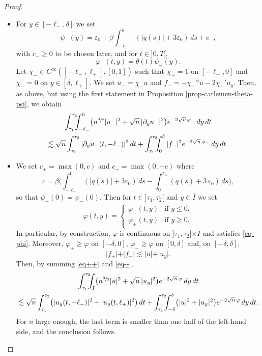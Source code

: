 \documentclass[10pt]{amsart}
\theoremstyle{plain}
\theoremstyle{definition}
\newcommand{\abs}[1]{\vert #1\vert}
\newcommand{\1}{\mathds 1}
\let\d\delta
\let\e\varepsilon
\let\f\varphi
\let\h\chi
\begin{document}
\begin{proof}
\begin{itemize}
\item
For $y \in [-\ell_-,\d]$ we set
\[
\psi_-(y) = \e_0 + \beta \int_{-\ell_-}^y (\abs{q(s)} + 3 \varepsilon_0)\, ds + c_-,
\]
with $c_- \geq 0$ to be chosen later, and for $t \in{}]0,T[$,
\[
\f_-(t,y) = \theta(t) \psi_-(y).
\]
Let $\h_- \in C^\infty([-\ell_-,\ell_+],[0,1])$ such that $\h_- = 1$ on $[-\ell_-,0]$ and $\h_- = 0$ on $y \in [\d,\ell_+]$. We set $u_- = \h_- u$ and $f_- = -\h_-'' u - 2 \h_-' u_y$. Then, as above, but using the first statement in Proposition \ref{prop-carlemen-theta-psi}, we obtain
\begin{multline} \label{eq--}
\int_{\tau_1}^{\tau_2}\hspace*{-2mm} \int_{-\ell_-}^0 \bigl(n^{\sfrac 32} \abs {u_-}^2 + \sqrt n\,\abs{\partial_y u_-}^2 \bigr) e^{- 2 \sqrt n\,\f_-} \, dy \, dt\\
\lesssim \sqrt n \int_{\tau_1}^{\tau_2} \abs{\partial_y u_-(t,-\ell_-)}^2 \, dt + \int_{\tau_1}^{\tau_2}\hspace*{-2mm} \int_0^\d \abs {f_-}^2 e^{-2\sqrt n\,\f_-} \, dy \, dt.
\end{multline}

\item
We set $c_+ = \max(0,c)$ and $c_- = \max(0,-c)$ where
\[
c = \beta \biggl(\int_{-\ell_-}^0 (\abs{q(s)} + 3\e_0)\, ds - \int_0^{\ell_+}(q(s) + 3\, \e_0)\,ds \biggr),
\]
so that $\psi_+(0) = \psi_-(0)$. Then for $t \in{}]\tau_1,\tau_2[$ and $y \in \bar I$ we set
\[
\f(t,y) =
\begin{cases}
\f_-(t,y) & \text{if } y \leq 0,\\
\f_+(t,y) & \text{if } y \geq 0.
\end{cases}
\]
In particular, by construction, $\f$ is continuous on $]\tau_1,\tau_2[\times \bar I$ and satisfies \eqref{eq-phi}. Moreover, $\f_+ \geq \f$ on $[-\d,0]$, $\f_- \geq \f$ on $[0,\d]$ and, on $[-\d,\d]$,
\[
\abs{f_+} + \abs {f_-} \lesssim \abs {u} + \abs{u_y}.
\]
Then, by summing \eqref{eq++} and \eqref{eq--},
\begin{multline*}
\int_{\tau_1}^{\tau_2}\hspace*{-2mm} \int_{I} \bigl(n^{\sfrac 32} \abs u^2 + \sqrt n\,\abs{u_y}^2 \bigr) e^{-2 \sqrt n\,\f} \, dy \, dt\\
\lesssim \sqrt n \int_{\tau_1}^{\tau_2} \bigl(\abs{u_y(t,-\ell_-)}^2 + \abs{u_y(t,\ell_+)}^2 \bigr) \, dt + \int_{\tau_1}^{\tau_2}\hspace*{-2mm} \int_{-\d}^\d \bigl(\abs u^2 + \abs{u_y}^2\bigr) e^{-2\sqrt n\,\f} \, dy \, dt.
\end{multline*}
For $n$ large enough, the last term is smaller than one half of the left-hand side, and the conclusion follows.\qedhere
\end{itemize}
\end{proof}
\end{document}
